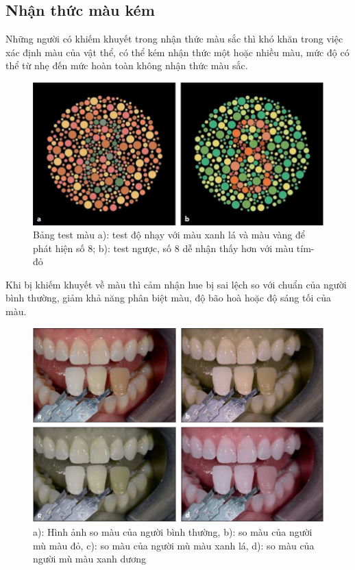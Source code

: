 \subsection{Nhận thức màu kém}
\qquad Những người có khiếm khuyết trong nhận thức màu sắc thì khó khăn trong việc xác định màu của vật thể, có thể kém nhận thức một hoặc nhiều màu, mức độ có thể từ nhẹ đến mức hoàn toàn không nhận thức màu sắc.\cite{TruongDinhKhoi}\par

\begin{figure}[h]
\centering
    \includegraphics[width=0.8\columnwidth]{pictures/mù màu.jpeg}
    \caption{Bảng test màu a): test độ nhạy với màu xanh lá và màu vàng để phát hiện số 8; b): test ngược, số 8 dễ nhận thấy hơn với màu tím- đỏ}
    \label{fig:mù màu}
\end{figure}


\quad Khi bị khiếm khuyết về màu thì cảm nhận hue bị sai lệch so với chuẩn của người bình thường, giảm khả năng phân biệt màu, độ bão hoà hoặc độ sáng tối của màu.\cite{TruongDinhKhoi}

\begin{figure}[h!]
\centering
    \includegraphics[width=0.8\columnwidth]{pictures/mắt.jpeg}
    \caption{a): Hình ảnh so màu của người bình thường, b): so màu của người mù màu đỏ, c): so màu của người mù màu xanh lá, d): so màu của người mù màu xanh dương}
    \label{fig:mắt}
\end{figure}

